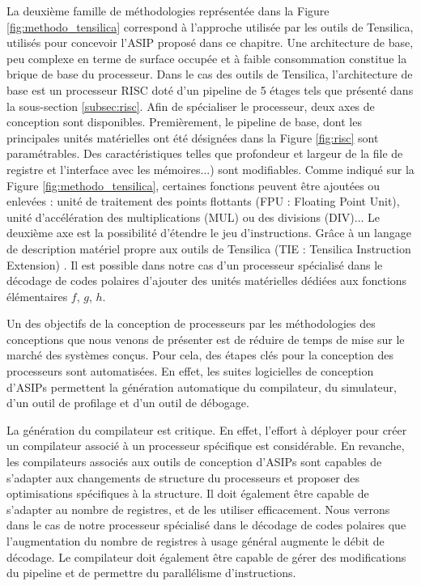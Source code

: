 La deuxième famille de méthodologies représentée dans la Figure \ref{fig:methodo_tensilica} correspond à l'approche utilisée par les outils de Tensilica, utilisés pour concevoir l'ASIP proposé dans ce chapitre. Une architecture de base, peu complexe en terme de surface occupée et à faible consommation constitue la brique de base du processeur. Dans le cas des outils de Tensilica, l'architecture de base est un processeur RISC doté d'un pipeline de 5 étages tels que présenté dans la sous-section \ref{subsec:risc}. Afin de spécialiser le processeur, deux axes de conception sont disponibles. Premièrement, le pipeline de base, dont les principales unités matérielles ont été désignées dans la Figure \ref{fig:risc} sont paramétrables. Des caractéristiques telles que profondeur et largeur de la file de registre et l'interface avec les mémoires...) sont modifiables. Comme indiqué sur la Figure \ref{fig:methodo_tensilica}, certaines fonctions peuvent être ajoutées ou enlevées : unité de traitement des points flottants (FPU : Floating Point Unit), unité d'accélération des multiplications (MUL) ou des divisions (DIV)... Le deuxième axe est la possibilité d'étendre le jeu d'instructions. Grâce à un langage de description matériel propre aux outils de Tensilica (TIE : Tensilica Instruction Extension) \cite{tie2017reference}. Il est possible dans notre cas d'un processeur spécialisé dans le décodage de codes polaires d'ajouter des unités matérielles dédiées aux fonctions élémentaires $f$, $g$, $h$.

Un des objectifs de la conception de processeurs par les méthodologies des conceptions que nous venons de présenter est de réduire de temps de mise sur le marché des systèmes conçus. Pour cela, des étapes clés pour la conception des processeurs sont automatisées. En effet, les suites logicielles de conception d'ASIPs permettent la génération automatique du compilateur, du simulateur, d'un outil de profilage et d'un outil de débogage. 

La génération du compilateur est critique. En effet, l'effort à déployer pour créer un compilateur associé à un processeur spécifique est considérable. En revanche, les compilateurs associés aux outils de conception d'ASIPs sont capables de s'adapter aux changements de structure du processeurs et proposer des optimisations spécifiques à la structure. Il doit également être capable de s'adapter au nombre de registres, et de les utiliser efficacement. Nous verrons dans le cas de notre processeur spécialisé dans le décodage de codes polaires que l'augmentation du nombre de registres à usage général augmente le débit de décodage. Le compilateur doit également être capable de gérer des modifications du pipeline et de permettre du parallélisme d'instructions.

